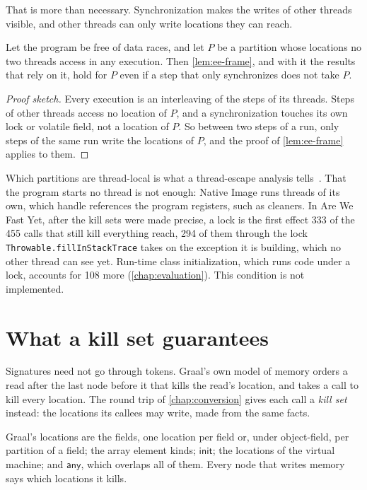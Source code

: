 That is more than necessary. Synchronization makes the writes of other threads
visible, and other threads can only write locations they can reach.

\begin{proposition}\label{prop:ee-thread-local}
Let the program be free of data races, and let $P$ be a partition whose
locations no two threads access in any execution. Then \cref{lem:ee-frame}, and
with it the results that rely on it, hold for $P$ even if a step that only
synchronizes does not take $P$.
\end{proposition}

\begin{proof}[Proof sketch]
Every execution is an interleaving of the steps of its threads. Steps of other
threads access no location of $P$, and a synchronization touches its own lock
or volatile field, not a location of $P$. So between two steps of a run, only
steps of the same run write the locations of $P$, and the proof of
\cref{lem:ee-frame} applies to them.
\end{proof}

Which partitions are thread-local is what a thread-escape analysis
tells~\cite{choi1999escape,salcianu2001escape}. That the program starts no thread
is not enough: Native Image runs threads of its own, which handle references the
program registers, such as cleaners. In Are We Fast Yet, after the kill sets
were made precise, a lock is the first effect 333 of the 455 calls that still
kill everything reach, 294 of them through the lock
\texttt{Throwable.fillInStackTrace} takes on the exception it is building,
which no other thread can see yet. Run-time class initialization, which runs
code under a lock, accounts for 108 more (\cref{chap:evaluation}). This
condition is not implemented.

\section{What a kill set guarantees}\label{sec:ee-kills}

Signatures need not go through tokens. Graal's own model of memory orders a read
after the last node before it that kills the read's location, and takes a call
to kill every location. The round trip of \cref{chap:conversion} gives each call
a \emph{kill set} instead: the locations its callees may write, made from the
same facts.

Graal's locations are the fields, one location per field or, under
object-field, per partition of a field; the array element kinds; $\mathsf{init}$;
the locations of the virtual machine; and $\mathsf{any}$, which overlaps all of
them. Every node that writes memory says which locations it kills.

